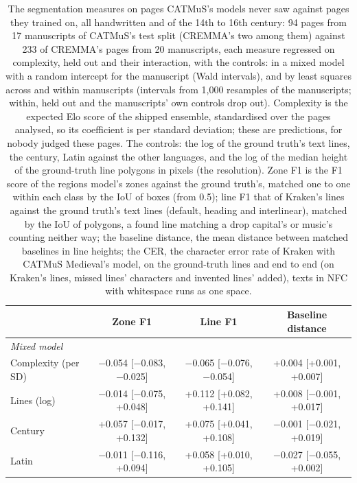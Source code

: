 \begin{table}[htbp]
  \centering
  \caption{The segmentation measures on pages CATMuS's models never saw against pages they trained on, all handwritten and of the 14th to 16th century: 94 pages from 17 manuscripts of CATMuS's test split (CREMMA's two among them) against 233 of CREMMA's pages from 20 manuscripts, each measure regressed on complexity, held out and their interaction, with the controls: in a mixed model with a random intercept for the manuscript (Wald intervals), and by least squares across and within manuscripts (intervals from 1,000 resamples of the manuscripts; within, held out and the manuscripts' own controls drop out). Complexity is the expected Elo score of the shipped ensemble, standardised over the pages analysed, so its coefficient is per standard deviation; these are predictions, for nobody judged these pages. The controls: the log of the ground truth's text lines, the century, Latin against the other languages, and the log of the median height of the ground-truth line polygons in pixels (the resolution). Zone F1 is the F1 score of the regions model's zones against the ground truth's, matched one to one within each class by the IoU of boxes (from 0.5); line F1 that of Kraken's lines against the ground truth's text lines (default, heading and interlinear), matched by the IoU of polygons, a found line matching a drop capital's or music's counting neither way; the baseline distance, the mean distance between matched baselines in line heights; the CER, the character error rate of Kraken with CATMuS Medieval's model, on the ground-truth lines and end to end (on Kraken's lines, missed lines' characters and invented lines' added), texts in NFC with whitespace runs as one space.}
  \label{tab:difficulty_held_out}
  \begin{tabular}{lccc}
    \toprule
     & Zone F1 & Line F1 & Baseline distance \\
    \midrule
    \textit{Mixed model} &  &  &  \\
    Complexity (per SD) & $-$0.054 [$-$0.083, $-$0.025] & $-$0.065 [$-$0.076, $-$0.054] & +0.004 [+0.001, +0.007] \\
    Lines (log) & $-$0.014 [$-$0.075, +0.048] & +0.112 [+0.082, +0.141] & +0.008 [$-$0.001, +0.017] \\
    Century & +0.057 [$-$0.017, +0.132] & +0.075 [+0.041, +0.108] & $-$0.001 [$-$0.021, +0.019] \\
    Latin & $-$0.011 [$-$0.116, +0.094] & +0.058 [+0.010, +0.105] & $-$0.027 [$-$0.055, +0.002] \\

\end{tabular}
\end{table}
